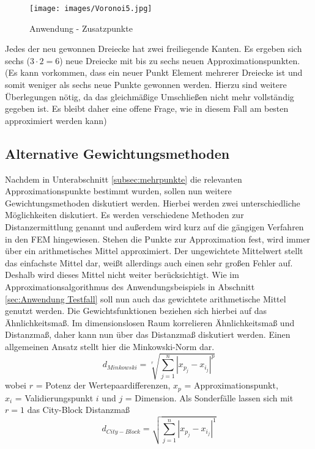 \begin{figure}[h]
	\centering
		\texttt{[image: images/Voronoi5.jpg]}
	\caption[Anwendung - Zusatzpunkte ]{Anwendung - Zusatzpunkte \cite{For15}}
	\label{fig:mehrPkt}
\end{figure}

Jedes der neu gewonnen Dreiecke hat zwei freiliegende Kanten. Es ergeben sich sechs ($3 \cdot 2 = 6$) neue Dreiecke mit bis zu sechs neuen Approximationspunkten. (Es kann vorkommen, dass ein neuer Punkt Element mehrerer Dreiecke ist und somit weniger als sechs neue Punkte gewonnen werden. Hierzu sind weitere Überlegungen nötig, da das gleichmäßige Umschließen nicht mehr vollständig gegeben ist. Es bleibt daher eine offene Frage, wie in diesem Fall am besten approximiert werden kann)


\subsection{Alternative Gewichtungsmethoden}
\label{subsec:gewichtung}
Nachdem in Unterabschnitt \ref{subsec:mehrpunkte} die relevanten Approximationspunkte bestimmt wurden, sollen nun weitere Gewichtungsmethoden diskutiert werden. Hierbei werden zwei unterschiedliche Möglichkeiten diskutiert. Es werden verschiedene Methoden zur Distanzermittlung genannt und außerdem wird kurz auf die gängigen Verfahren in den FEM hingewiesen. Stehen die Punkte zur Approximation fest, wird immer über ein arithmetisches Mittel approximiert. Der ungewichtete Mittelwert stellt das einfachste Mittel dar, weißt allerdings auch einen sehr großen Fehler auf. Deshalb wird dieses Mittel nicht weiter berücksichtigt.  Wie im Approximationsalgorithmus des Anwendungsbeispiels in Abschnitt \ref{sec:Anwendung Testfall} soll nun auch das gewichtete arithmetische Mittel genutzt werden. Die Gewichtsfunktionen beziehen sich hierbei auf das Ähnlichkeitsmaß. Im dimensionslosen Raum korrelieren Ähnlichkeitsmaß und Distanzmaß, daher kann nun über das Distanzmaß diskutiert werden. Einen allgemeinen Ansatz stellt hier die Minkowski-Norm dar.
\begin{equation}\label{f74}
d_{Minkowski} = \sqrt[r]{\sum_{j=1}^n|x_{p_j}-x_{i_j}|^p}
\end{equation}
wobei $r$ = Potenz der Wertepaardifferenzen, $x_p$ =  Approximationspunkt,\\ $x_i$ = Validierungspunkt $i$ und $j$ = Dimension. Als Sonderfälle lassen sich mit $r = 1$ das City-Block Distanzmaß
\begin{equation}\label{f75}
d_{City-Block} = \sqrt{\sum_{j=1}^n|x_{p_j}-x_{i_j}|^1}
\end{equation}
